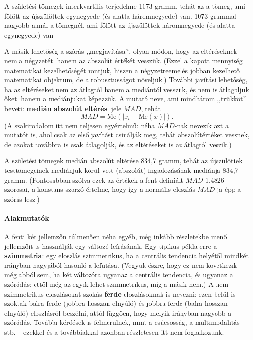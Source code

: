 \documentclass[]{book}
\let\oldparagraph\paragraph
\renewcommand{\paragraph}[1]{\oldparagraph{#1}\mbox{}}
\begin{document}
A születési tömegek interkvartilis terjedelme 1073 gramm, tehát az a
tömeg, ami fölött az újszülöttek egynegyede (és alatta háromnegyede)
van, 1073 grammal nagyobb annál a tömegnél, ami fölött az újszülöttek
háromnegyede (és alatta egynegyede) van.

A másik lehetőség a szórás ,,megjavítása'`, olyan módon, hogy az
eltéréseknek nem a négyzetét, hanem az abszolút értékét vesszük. (Ezzel
a kapott mennyiség matematikai kezelhetőségét rontjuk, hiszen a
négyzetreemelés jobban kezelhető matematikai objektum, de a
robusztusságot növeljük.) További javítási lehetőség, ha az eltéréseket
nem az átlagtól hanem a mediántól vesszük, és nem is átlagoljuk őket,
hanem a mediánjukat képezzük. A mutató neve, ami mindhárom ,,trükköt''
beveti: \textbf{medián abszolút eltérés}, jele \(MAD\), tehát \[
    MAD=\mathrm{Me}\left(\left|x_i-\mathrm{Me}\left(x\right)\right|\right).
\] (A szakirodalom itt nem teljesen egyértelmű: néha \(MAD\)-nak nevezik
azt a mutatót is, ahol csak az első javítást csinálják meg, tehát
abszolútértéket vesznek, de azokat továbbra is csak átlagolják, és az
eltéréseket is az átlagtól veszik.)

A születési tömegek medián abszolút eltérése 834,7 gramm, tehát az
újszülöttek testtömegeinek mediánjuk körül vett (abszolút) ingadozásának
mediánja 834,7 gramm. (Pontosabban szólva ezek az értékek a fent
definiált \(MAD\) 1,4826-szorosai, a konstans szorzó értelme, hogy így a
normális eloszlás \(MAD\)-ja épp a szórás lesz.)

\paragraph{Alakmutatók}\label{deskriptivmennyegyvaltanalitikusmutatoszamokalakmutatok}

A fenti két jellemzőn túlmenően néha egyéb, még inkább részletekbe menő
jellemzőit is használják egy változó leírásának. Egy tipikus példa erre
a \textbf{szimmetria}: egy eloszlás szimmetrikus, ha a centrális
tendencia helyétől mindkét irányban nagyjából hasonló a lefutása.
(Vegyük észre, hogy ez nem következik még abból sem, ha két változóra
ugyanaz a centrális tendencia, és ugyanaz a szóródás: ettől még az egyik
lehet szimmetrikus, míg a másik nem.) A nem szimmetrikus eloszlásokat
szokás \textbf{ferde} eloszlásoknak is nevezni; ezen belül is szoktak
balra ferde (jobbra hosszan elnyúló) és jobbra ferde (balra hosszan
elnyúló) eloszlásról beszélni, attól függően, hogy melyik irányban
nagyobb a szóródás. További kérdések is felmerülnek, mint a csúcsosság,
a multimodalitás stb. -- ezekkel és a továbbiakkal azonban részletesen
itt nem foglalkozunk.
\end{document}
